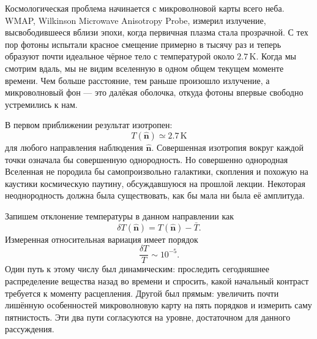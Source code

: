 Космологическая проблема начинается с микроволновой карты всего неба. WMAP, Wilkinson Microwave Anisotropy Probe, измерил излучение, высвободившееся вблизи эпохи, когда первичная плазма стала прозрачной. С тех пор фотоны испытали красное смещение примерно в тысячу раз и теперь образуют почти идеальное чёрное тело с температурой около \(2.7\,\mathrm K\). Когда мы смотрим вдаль, мы не видим вселенную в одном общем текущем моменте времени. Чем больше расстояние, тем раньше произошло излучение, а микроволновый фон — это далёкая оболочка, откуда фотоны впервые свободно устремились к нам.

\begin{classroomqa}
\end{classroomqa}

В первом приближении результат изотропен:
\[
T(\hat{\mathbf n})\simeq 2.7\,\mathrm K
\]
для любого направления наблюдения \(\hat{\mathbf n}\). Совершенная изотропия вокруг каждой точки означала бы совершенную однородность. Но совершенно однородная Вселенная не породила бы самопроизвольно галактики, скопления и похожую на каустики космическую паутину, обсуждавшуюся на прошлой лекции. Некоторая неоднородность должна была существовать, как бы мала ни была её амплитуда.

Запишем отклонение температуры в данном направлении как
\[
\delta T(\hat{\mathbf n})=T(\hat{\mathbf n})-\bar T.
\]
Измеренная относительная вариация имеет порядок
\begin{equation}
\frac{\delta T}{T}\sim10^{-5}.
\label{eq:c10-cmb-anisotropy}
\end{equation}
Один путь к этому числу был динамическим: проследить сегодняшнее распределение вещества назад во времени и спросить, какой начальный контраст требуется к моменту расцепления. Другой был прямым: увеличить почти лишённую особенностей микроволновую карту на пять порядков и измерить саму пятнистость. Эти два пути согласуются на уровне, достаточном для данного рассуждения.


